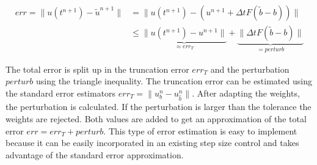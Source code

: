 \documentclass[a4paper]{article}
\numberwithin{equation}{section}
\theoremstyle{plain}
\theoremstyle{definition}
\numberwithin{theorem}{section}
\newcommand{\dt}{{\Delta t}}
\newcommand{\1}{\mathbbm{1}}
\newcommand{\bt}{\tilde{b}}
\begin{document}
\begin{align}
err = \|u(t^{n+1})-\tilde u^{n+1}\| &= \|u(t^{n+1}) - (u^{n+1}+\dt F(\bt-b))\| \\
 &\leq \underbrace{\|u(t^{n+1})-u^{n+1}\|}_{\approx err_T}+\underbrace{\|\dt F(\bt-b)\|}_{= perturb} \label{eq:Err}
\end{align}

The total error is split up in the truncation error $err_T$ and the perturbation $perturb$ using the triangle inequality.
The truncation error can be estimated using the standard error estimators $err_T = \| u^{n}_{b} - u^{n}_{\hat{b}} \|$.
After adapting the weights, the perturbation is calculated. If the perturbation is larger than the tolerance the weights are rejected.
Both values are added to get an approximation of the total error $err = err_T + perturb$.
This type of error estimation is easy to implement because it can be easily incorporated in an existing step size control and takes advantage of the standard error approximation.

\end{document}
